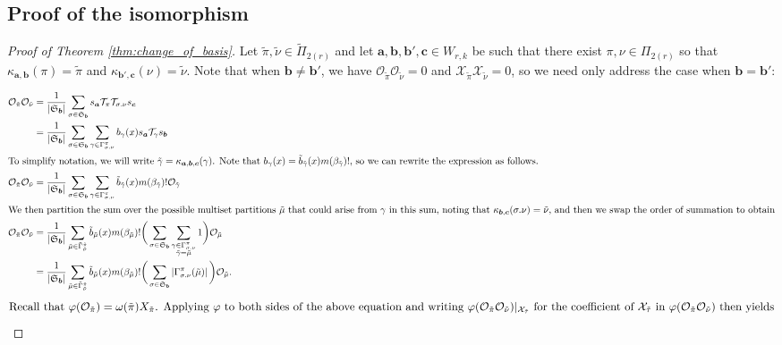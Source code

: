 \documentclass[10pt]{amsart}
\theoremstyle{definition}
\theoremstyle{definition}
\theoremstyle{plain}
\theoremstyle{remark}
\theoremstyle{plain}
\theoremstyle{plain}
\newcommand{\TT}{\mathcal{T}}
\newcommand{\XX}{\mathcal{X}}
\newcommand{\OO}{\mathcal{O}}
\newcommand{\SG}{\mathfrak{S}}
\newcommand{\bfa}{{\boldsymbol{a}}}
\newcommand{\bfb}{{\boldsymbol{b}}}
\newcommand{\bfc}{{\boldsymbol{c}}}
\newcommand{\ttau}{{\tilde{\tau}}}
\newcommand{\tpi}{{\tilde{\pi}}}
\newcommand{\tgamma}{{\tilde{\gamma}}}
\newcommand{\tmu}{{\tilde{\mu}}}
\newcommand{\tnu}{{\tilde{\nu}}}
\newcommand{\abs}[1]{\left| #1\right |}
\begin{document}
\subsection{Proof of the isomorphism}

\begin{proof}[Proof of Theorem \ref{thm:change_of_basis}]
    Let $\tpi,\tnu\in\tilde\Pi_{2(r)}$ and let $\bfa,\bfb,\bfb',\bfc\in W_{r,k}$ be such that there exist $\pi,\nu\in\Pi_{2(r)}$ so that $\kappa_{\bfa,\bfb}(\pi)=\tpi$ and $\kappa_{\bfb',\bfc}(\nu)=\tnu$. Note that when $\bfb\neq\bfb'$, we have $\OO_\tpi\OO_\tnu=0$ and $\XX_\tpi \XX_\tnu=0$, so we need only address the case when $\bfb=\bfb'$:

    \begin{align*}
        \OO_\tpi\OO_\tnu&=\frac{1}{\abs{\SG_\bfb}}\sum_{\sigma\in\SG_\bfb}s_\bfa\TT_\pi\TT_{\sigma.\nu}s_\bfc\\
        &=\frac{1}{\abs{\SG_\bfb}}\sum_{\sigma\in\SG_\bfb}\sum_{\gamma\in\Gamma^\pi_{\sigma.\nu}} b_\gamma(x) s_\bfa \TT_\gamma s_\bfb\\
        \intertext{To simplify notation, we will write $\tgamma=\kappa_{\bfa,\bfb,\bfc}(\gamma)$. Note that $b_\gamma(x)=\tilde{b}_{\tgamma}(x)m(\beta_\tgamma)!$, so we can rewrite the expression as follows.}
        \OO_\tpi\OO_\tnu&=\frac{1}{\abs{\SG_\bfb}}\sum_{\sigma\in\SG_\bfb}\sum_{\gamma\in\Gamma^\pi_{\sigma.\nu}} \tilde{b}_\tgamma(x)m(\beta_\tgamma)! \OO_{\tgamma}\\
        \intertext{We then partition the sum over the possible multiset partitions $\tmu$ that could arise from $\gamma$ in this sum, noting that $\kappa_{\bfb,\bfc}(\sigma.\nu)=\tnu$, and then we swap the order of summation to obtain}
        \OO_\tpi\OO_\tnu&=\frac{1}{\abs{\SG_\bfb}}\sum_{\tmu\in\tilde\Gamma_{\tnu}^\tpi} \tilde{b}_\tmu(x)m(\beta_\tmu)!\bigg(\sum_{\sigma\in\SG_\bfb}\sum_{\substack{\gamma\in\Gamma^\pi_{\sigma.\nu}\\\tgamma=\tmu}}1\bigg)\OO_\tmu\\
        &=\frac{1}{\abs{\SG_\bfb}}\sum_{\tmu\in\tilde\Gamma_{\tnu}^\tpi} \tilde{b}_\tmu(x)m(\beta_\tmu)!\bigg(\sum_{\sigma\in\SG_\bfb}\abs{\Gamma^\pi_{\sigma.\nu}(\tmu)}\bigg)\OO_\tmu.
    \end{align*}
    \begin{align}
        \intertext{Recall that $\varphi(\OO_\tpi)=\omega(\tpi)X_\tpi$. Applying $\varphi$ to both sides of the above equation and writing $\varphi(\OO_\tpi\OO_\tnu)|_{\XX_\ttau}$ for the coefficient of $\XX_\ttau$ in $\varphi(\OO_\tpi\OO_\tnu)$ then yields}

\end{align}
\end{proof}
\end{document}
